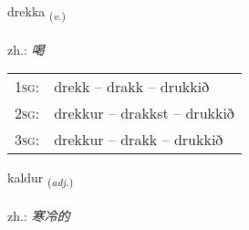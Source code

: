 \documentclass[frontgrid, backgrid]{flacards}\usepackage[]{graphicx}\usepackage[]{xcolor}
\begin{document}
\renewcommand{\blhead}{\vskip5pt {\small\bfseries\footnotesize Sagnorð | 动词 }}
\renewcommand{\bcfoot}{\vskip5pt \hspace{2pt}{\small\bfseries\footnotesize 1K}}


{drekka \small{\textsubscript{(\textit{v.})}} \\[1ex] %
\textphonetic{[trɛhka]} \\
zh.: \emph{喝} \\  [2ex]
\renewcommand*{\arraystretch}{0.8}
\begin{tabular}{p{1cm}l}
\textsc{1sg}: & drekk -- drakk -- drukkið \\ 
\textsc{2sg}: & drekkur -- drakkst -- drukkið \\ 
\textsc{3sg}: & drekkur -- drakk -- drukkið \\ 
\end{tabular}
}

\renewcommand{\flhead}{\vskip5pt \fboxsep=0pt {\small\bfseries\footnotesize Lýsingarorð | 形容词}}
\renewcommand{\fcfoot}{\vskip5pt \fboxsep=0pt \hspace{2pt}{\small\bfseries\footnotesize 1K}}

\renewcommand{\blhead}{\vskip5pt {\small\bfseries\footnotesize Lýsingarorð | 形容词 }}
\renewcommand{\bcfoot}{\vskip5pt \hspace{2pt}{\small\bfseries\footnotesize 1K}}


{kaldur \small{\textsubscript{(\textit{adj.})}} \\[1ex] %
\textphonetic{[kʰaltʏr]} \\
zh.: \emph{寒冷的} \\  [2ex]
\renewcommand*{\arraystretch}{0.8}
}
\end{document}
